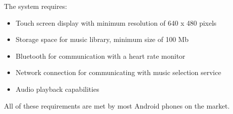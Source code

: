 The system requires:
\begin{itemize}
  \item Touch screen display with minimum resolution of 640 x 480 pixels
  \item Storage space for music library, minimum size of 100 Mb
  \item Bluetooth for communication with a heart rate monitor
  \item Network connection for communicating with music selection service
  \item Audio playback capabilities
\end{itemize}
All of these requirements are met by most Android phones on the market.